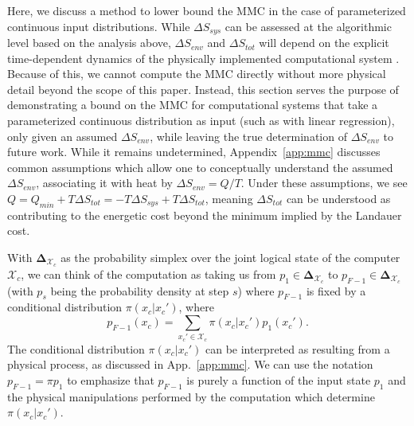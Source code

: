 \documentclass[12pt,onecolumn, margin=1in]{IEEEtran}
\newcommand{\compsimplex}{\boldsymbol{\Delta}_{\mathcal{X}_c}}
\begin{document}
Here, we discuss a method to lower bound the MMC in the case of parameterized continuous input distributions. While $\Delta S_{sys}$ can be assessed at the algorithmic level based on the analysis above, $\Delta S_{env}$ and $\Delta S_{tot}$ will depend on the explicit time-dependent dynamics of the physically implemented computational system \cite{Wolpert2019, KolchinskyWolpert2021, Yadav2025}. Because of this, we cannot compute the MMC directly without more physical detail beyond the scope of this paper. Instead, this section serves the purpose of
demonstrating a bound on the MMC for computational systems that take a parameterized
continuous distribution as input (such as with linear regression), only given an assumed $\Delta S_{env}$, while leaving the true determination of $\Delta S_{env}$ to future work. While it remains undetermined, Appendix~\ref{app:mmc} discusses common assumptions which allow one to conceptually understand the assumed $\Delta S_{env}$, associating it with heat by $\Delta S_{env} = Q/T$. Under these assumptions, we see $Q = Q_{min} + T\Delta S_{tot} = -T\Delta S_{sys} + T\Delta S_{tot}$, meaning $\Delta S_{tot}$ can be understood as contributing to the energetic cost beyond the minimum implied by the Landauer cost.

With $\compsimplex$ as the probability simplex over the joint logical state of the computer $\mathcal{X}_c$, we can think of the computation as taking us from $p_1 \in \compsimplex$ to $p_{F-1} \in \compsimplex$ (with $p_s$ being the probability density at step $s$) where $p_{F-1}$ is fixed by a conditional distribution $\pi(x_c|x_c')$, where
\begin{equation}
    p_{F-1}(x_c) = \sum_{x_c'\in \mathcal{X}_c} \pi(x_c|x_c') p_1(x_c').
\end{equation}
The conditional distribution $\pi(x_c|x_c')$ can be interpreted as resulting from a physical process, as discussed in App.~\ref{app:mmc}. We can use the notation $p_{F-1} = \pi p_1$ to emphasize that $p_{F-1}$ is purely a function of the input state $p_1$ and the physical manipulations performed by the computation which determine $\pi(x_c|x_c')$.
\end{document}
